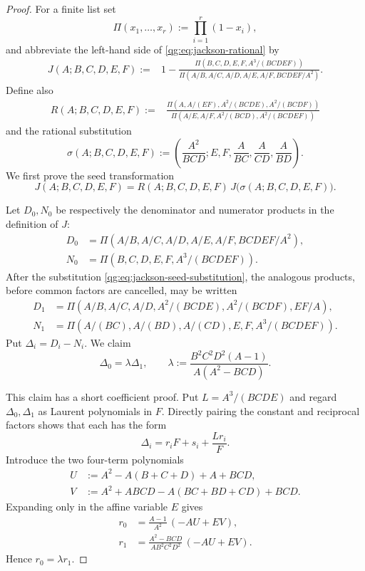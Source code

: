 \begin{proof}
For a finite list set
\[
 \Pi(x_1,\ldots,x_r):=\prod_{i=1}^{r}(1-x_i),
\]
and abbreviate the left-hand side of
\eqref{qg:eq:jackson-rational} by
\begin{align*}
J(A;B,C,D,E,F)
:={}&1-
\frac{\Pi(B,C,D,E,F,A^3/(BCDEF))}
{\Pi(A/B,A/C,A/D,A/E,A/F,BCDEF/A^2)}.
\end{align*}
Define also
\begin{align*}
R(A;B,C,D,E,F)
:={}&
\frac{\Pi(A,A/(EF),A^2/(BCDE),A^2/(BCDF))}
{\Pi(A/E,A/F,A^2/(BCD),A^2/(BCDEF))}
\end{align*}
and the rational substitution
\begin{equation}
\label{qg:eq:jackson-seed-substitution}
\sigma(A;B,C,D,E,F)
:=\left(
 \frac{A^2}{BCD};
 E,F,\frac{A}{BC},\frac{A}{CD},\frac{A}{BD}
\right).
\end{equation}
We first prove the seed transformation
\begin{equation}
\label{qg:eq:jackson-seed}
 J(A;B,C,D,E,F)
 =R(A;B,C,D,E,F)\,J\bigl(\sigma(A;B,C,D,E,F)\bigr).
\end{equation}

Let $D_0,N_0$ be respectively the denominator and numerator products in the
definition of $J$:
\begin{align*}
D_0&=\Pi(A/B,A/C,A/D,A/E,A/F,BCDEF/A^2),\\
N_0&=\Pi(B,C,D,E,F,A^3/(BCDEF)).
\end{align*}
After the substitution \eqref{qg:eq:jackson-seed-substitution}, the analogous
products, before common factors are cancelled, may be written
\begin{align*}
D_1&=\Pi(A/B,A/C,A/D,A^2/(BCDE),A^2/(BCDF),EF/A),\\
N_1&=\Pi(A/(BC),A/(BD),A/(CD),E,F,A^3/(BCDEF)).
\end{align*}
Put $\Delta_i=D_i-N_i$.  We claim
\begin{equation}
\label{qg:eq:jackson-delta-transform}
 \Delta_0=\lambda\Delta_1,
 \qquad
 \lambda:=\frac{B^2C^2D^2(A-1)}{A(A^2-BCD)}.
\end{equation}

This claim has a short coefficient proof.  Put $L=A^3/(BCDE)$ and regard
$\Delta_0,\Delta_1$ as Laurent polynomials in $F$.  Directly pairing the
constant and reciprocal factors shows that each has the form
\[
 \Delta_i=r_iF+s_i+\frac{Lr_i}{F}.
\]
Introduce the two four-term polynomials
\begin{align*}
U&:=A^2-A(B+C+D)+A+BCD,\\
V&:=A^2+ABCD-A(BC+BD+CD)+BCD.
\end{align*}
Expanding only in the affine variable $E$ gives
\begin{align*}
r_0&=\frac{A-1}{A^2}\,(-AU+EV),\\
r_1&=\frac{A^2-BCD}{AB^2C^2D^2}\,(-AU+EV).
\end{align*}
Hence $r_0=\lambda r_1$.


\end{proof}
